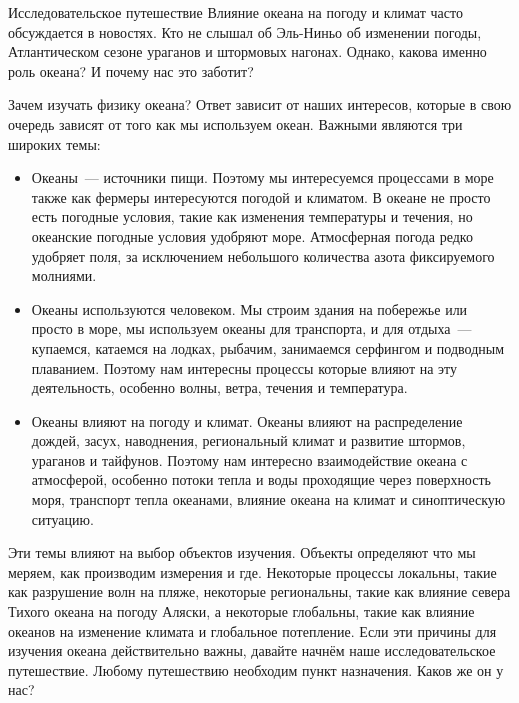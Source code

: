 
\begin{chapter}{Исследовательское путешествие}
Влияние океана на погоду и климат часто обсуждается в новостях. Кто не слышал 
об Эль-Ниньо об изменении погоды, Атлантическом сезоне ураганов и штормовых 
нагонах. Однако, какова именно роль океана? И почему нас это заботит?

\begin{section}{Зачем изучать физику океана?}
Ответ зависит от наших интересов, которые в свою очередь зависят от того 
как мы используем океан. Важными являются три широких темы:

\begin{itemize}
\item 
Океаны~--- источники пищи. Поэтому мы интересуемся процессами в море также как 
фермеры интересуются погодой и климатом. В океане не просто есть погодные 
условия, такие как изменения температуры и течения, но океанские погодные 
условия удобряют море. Атмосферная погода редко удобряет поля, за исключением 
небольшого количества азота фиксируемого молниями.

\item
Океаны используются человеком. Мы строим здания на побережье или просто в море, 
мы используем океаны для транспорта, и для отдыха~--- купаемся, катаемся на 
лодках, рыбачим, занимаемся серфингом и подводным плаванием. Поэтому нам 
интересны процессы которые влияют на эту деятельность, особенно волны, ветра, 
течения и температура.

\item
Океаны влияют на погоду и климат. Океаны влияют на распределение дождей, засух, 
наводнения, региональный климат и развитие штормов, ураганов и тайфунов. 
Поэтому нам интересно взаимодействие океана с атмосферой, особенно потоки тепла 
и воды проходящие через поверхность моря, транспорт тепла океанами, влияние 
океана на климат и синоптическую ситуацию.
\end{itemize}

Эти темы влияют на выбор объектов изучения. Объекты определяют что мы меряем, 
как производим измерения и где. Некоторые процессы локальны, такие как 
разрушение волн на пляже, некоторые региональны, такие как влияние севера 
Тихого океана на погоду Аляски, а некоторые глобальны, такие как влияние 
океанов на изменение климата и глобальное потепление. Если эти причины для
изучения океана действительно важны, давайте начнём наше исследовательское
путешествие. Любому путешествию необходим пункт назначения. Каков же он у нас?
\end{section}


\end{chapter}
